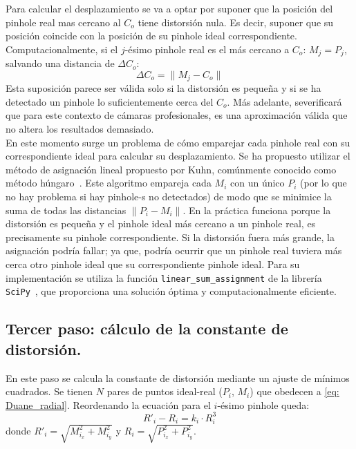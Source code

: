\documentclass[12pt]{article}
\numberwithin{equation}{section}%
\newcommand{\lightit}[1]{{\lightitfont #1}}
\begin{document}
Para calcular el desplazamiento se va a optar por suponer que la posición del \lightit{pinhole} real mas cercano al \(C_o\) tiene distorsión nula. Es decir, suponer que su posición coincide con la posición de su \lightit{pinhole} ideal correspondiente. Computacionalmente, si el \(j\)-ésimo \lightit{pinhole} real es el más cercano a \(C_o\): \(M_j=P_j\), salvando una distancia de \(\Delta C_o\):
\begin{equation}
    \Delta C_o=\|M_j-C_o\|    
    \label{eq:error_centrooptico} 
\end{equation}
Esta suposición parece ser válida solo si la distorsión es pequeña y si se ha detectado un \lightit{pinhole} lo suficientemente cerca del \(C_o\). Más adelante, severificará que para este contexto de cámaras profesionales, es una aproximación válida que no altera los resultados demasiado.\\

En este momento surge un problema de cómo emparejar cada \lightit{pinhole} real con su correspondiente ideal para calcular su desplazamiento. Se ha propuesto utilizar el método de asignación lineal propuesto por Kuhn, comúnmente conocido como método húngaro~\cite{kuhn1955hungarian}. Este algoritmo empareja cada \(M_i\) con un único \(P_i\) (por lo que no hay problema si hay \lightit{pinhole}-s no detectados) de modo que se minimice la suma de todas las distancias \(\|P_i-M_i\|\). En la práctica funciona porque la distorsión es pequeña y el \lightit{pinhole} ideal más cercano a un \lightit{pinhole} real, es precisamente su \lightit{pinhole} correspondiente. Si la distorsión fuera más grande, la asignación podría fallar; ya que, podría ocurrir que un \lightit{pinhole} real tuviera más cerca otro \lightit{pinhole} ideal que su correspondiente \lightit{pinhole} ideal. Para su implementación se utiliza la función \texttt{linear\_sum\_assignment} de la librería \texttt{SciPy}~\cite {virtanen2020scipy}, que proporciona una solución óptima y computacionalmente eficiente.

\subsection{Tercer paso: cálculo de la constante de distorsión.}
En este paso se calcula la constante de distorsión mediante un ajuste de mínimos cuadrados. Se tienen \(N\) pares de puntos ideal-real (\(P_i\), \(M_i\)) que obedecen a \eqref{eq: Duane_radial}. Reordenando la ecuación para el \(i\)-ésimo \lightit{pinhole} queda:
\begin{equation}
    R'_i-R_i = k_i\cdot R_i^3
    \label{eq: reg}
\end{equation}
donde \(R'_i=\sqrt{M^2_{i_x}+M^2_{i_y}}\) y \(R_i=\sqrt{P^2_{i_x}+P^2_{i_y}}\).\\
\end{document}
